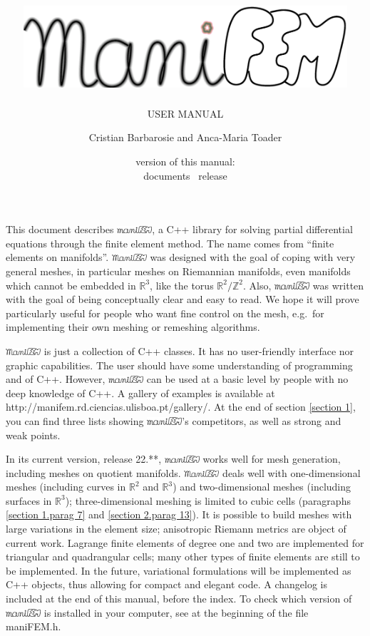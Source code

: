 \documentclass[a4paper,oneside]{scrbook}
\title{\includegraphics[width=12cm]{manifem-grey-capital.eps}}
\subtitle{USER MANUAL}
\author{Cristian Barbarosie and Anca-Maria Toader}
\date{\small version of this manual: \manualversion\\ documents \maniFEM\ release \manifemrelease}
\def\manifemrelease{22.**}
\def\numb{}
\newcommand\ManiFEM{\leavevmode\hbox{\includegraphics[width=13mm]{manifem-large}}}
\newcommand\maniFEM{\leavevmode\hbox{\includegraphics[width=13mm]{manifem-small}}}
\renewcommand\tt{\normalfont\ttfamily}
\begin{document}
\frontmatter
\begin{titlepage}
\maketitle
\end{titlepage}



\chapter*{}

This document describes \maniFEM, a {\tt C++} library for solving partial differential equations
through the finite element method.
The name comes from ``finite elements on manifolds''. 
{\ManiFEM} was designed with the goal of coping with very general meshes,
in particular meshes on Riemannian manifolds, even manifolds which cannot be embedded
in $ {\mathbb R}^3 $, like the torus $ {\mathbb R}^2/{\mathbb Z}^2 $.
Also, {\maniFEM} was written with the goal of being conceptually clear
and easy to read.
We hope it will prove particularly useful for people who want fine control on the mesh,
e.g.\ for implementing their own meshing or remeshing algorithms.

{\ManiFEM} is just a collection of {\tt C++} classes.
It has no user-friendly interface nor graphic capabilities.
The user should have some understanding of programming and of {\tt C++}.
However, {\maniFEM} can be used at a basic level by people with no deep knowledge of
{\tt C++}.
A gallery of examples is available at {\small\tt http://manifem.rd.ciencias.ulisboa.pt/gallery/}.
At the end of section \ref{\numb section 1}, you can find three lists showing
{\maniFEM}'s competitors, as well as strong and weak points.

In its current version, release \manifemrelease, {\maniFEM} works well for mesh generation,
including meshes on quotient manifolds.
{\ManiFEM} deals well with one-dimensional meshes (including curves in $ {\mathbb R}^2 $ and
$ {\mathbb R}^3 $) and two-dimensional meshes (including surfaces in $ {\mathbb R}^3 $);
three-dimensional meshing is limited to cubic cells
(paragraphs \ref{\numb section 1.\numb parag 7} and \ref{\numb section 2.\numb parag 13}).
It is possible to build meshes with large variations in the element size;
anisotropic Riemann metrics are object of current work.
Lagrange finite elements of degree one and two are implemented for triangular and quadrangular
cells; many other types of finite elements are still to be implemented.
In the future, variational formulations will be implemented as {\tt C++} objects,
thus allowing for compact and elegant code.
A changelog is included at the end of this manual, before the index.
To check which version of {\maniFEM} is installed in your computer,
see at the beginning of the file {\small\tt maniFEM.h}.
\end{document}
